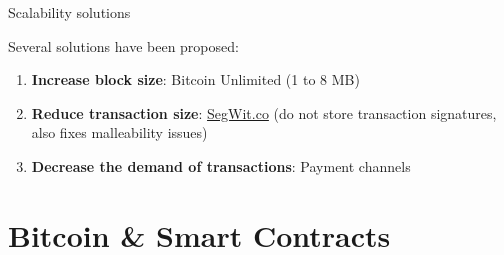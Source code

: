 \documentclass{beamer}
\begin{document}
\begin{frame}{Scalability solutions}
 \begin{center}
  Several solutions have been proposed:\\
  \pause
  \begin{enumerate}[<+->]
   \item \textbf{Increase block size}: Bitcoin Unlimited (1 to 8 MB)
   \item \textbf{Reduce transaction size}: \url{SegWit.co} (do not store transaction signatures, also fixes malleability issues)
   \item \textbf{Decrease the demand of transactions}: Payment channels
  \end{enumerate}
 \end{center}
\end{frame}
\section{Bitcoin \& Smart Contracts}
\end{document}
